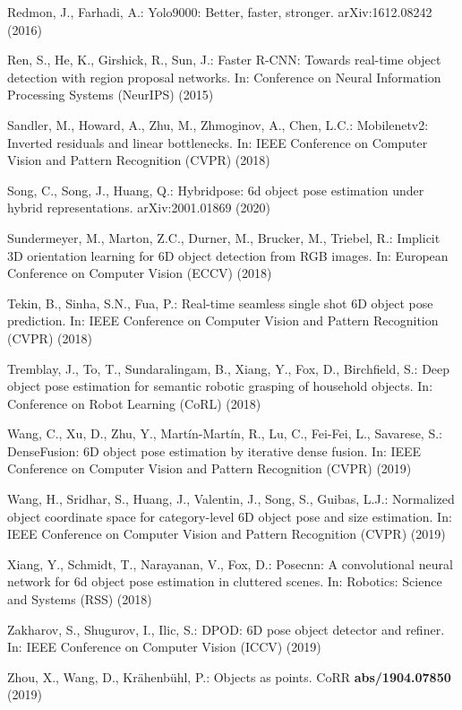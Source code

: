 \documentclass[runningheads]{llncs}
\begin{document}
\begin{thebibliography}{10}
Redmon, J., Farhadi, A.: Yolo9000: Better, faster, stronger. arXiv:1612.08242
  (2016)

Ren, S., He, K., Girshick, R., Sun, J.: {Faster R-CNN}: Towards real-time
  object detection with region proposal networks. In: Conference on Neural
  Information Processing Systems (NeurIPS) (2015)

Sandler, M., Howard, A., Zhu, M., Zhmoginov, A., Chen, L.C.: Mobilenetv2:
  Inverted residuals and linear bottlenecks. In: IEEE Conference on Computer
  Vision and Pattern Recognition (CVPR) (2018)

Song, C., Song, J., Huang, Q.: Hybridpose: 6d object pose estimation under
  hybrid representations. arXiv:2001.01869 (2020)

Sundermeyer, M., Marton, Z.C., Durner, M., Brucker, M., Triebel, R.: Implicit
  {3D} orientation learning for {6D} object detection from {RGB} images. In:
  European Conference on Computer Vision (ECCV) (2018)

Tekin, B., Sinha, S.N., Fua, P.: Real-time seamless single shot {6D} object
  pose prediction. In: IEEE Conference on Computer Vision and Pattern
  Recognition (CVPR) (2018)

Tremblay, J., To, T., Sundaralingam, B., Xiang, Y., Fox, D., Birchfield, S.:
  Deep object pose estimation for semantic robotic grasping of household
  objects. In: Conference on Robot Learning (CoRL) (2018)

Wang, C., Xu, D., Zhu, Y., Martín-Martín, R., Lu, C., Fei-Fei, L., Savarese,
  S.: {DenseFusion}: {6D} object pose estimation by iterative dense fusion. In:
  IEEE Conference on Computer Vision and Pattern Recognition (CVPR) (2019)

Wang, H., Sridhar, S., Huang, J., Valentin, J., Song, S., Guibas, L.J.:
  Normalized object coordinate space for category-level {6D} object pose and
  size estimation. In: IEEE Conference on Computer Vision and Pattern
  Recognition (CVPR) (2019)

Xiang, Y., Schmidt, T., Narayanan, V., Fox, D.: Posecnn: A convolutional neural
  network for 6d object pose estimation in cluttered scenes. In: Robotics:
  Science and Systems (RSS) (2018)

Zakharov, S., Shugurov, I., Ilic, S.: {DPOD}: {6D} pose object detector and
  refiner. In: IEEE Conference on Computer Vision (ICCV) (2019)

Zhou, X., Wang, D., Kr\"{a}henb\"{u}hl, P.: Objects as points. CoRR
  \textbf{abs/1904.07850} (2019)

\end{thebibliography}
 
\end{document}
